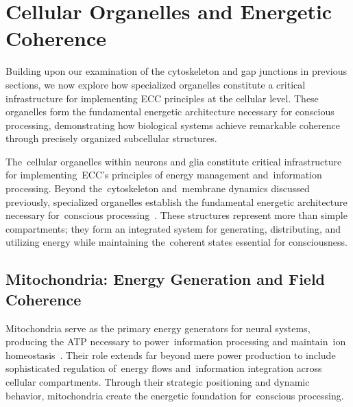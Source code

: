 \section{Cellular Organelles and Energetic Coherence~~}

Building upon our examination of the cytoskeleton and gap junctions in previous sections, we now explore how specialized organelles constitute a critical infrastructure for implementing ECC principles at the cellular level. These organelles form the fundamental energetic architecture necessary for conscious processing, demonstrating how biological systems achieve remarkable coherence through precisely organized subcellular structures.

The~cellular organelles within neurons and glia constitute critical infrastructure for implementing~ECC's principles of energy management and~information processing. Beyond the~cytoskeleton and~membrane dynamics discussed previously, specialized organelles establish the fundamental energetic architecture necessary for~conscious processing~\cite{Verkhratsky2018, Harris2012}. These structures represent more than simple compartments; they form an integrated system for generating, distributing, and utilizing energy while maintaining the~coherent states essential for consciousness.

\subsection*{Mitochondria: Energy Generation and Field Coherence~~}

Mitochondria serve as the primary energy generators for neural systems, producing the ATP necessary to power~information processing and maintain~ion homeostasis~\cite{Harris2012, Picard2014}. Their role extends far beyond mere power production to include sophisticated regulation of~energy flows and~information integration across cellular compartments. Through their strategic positioning and dynamic behavior, mitochondria create the energetic foundation for~conscious processing.


